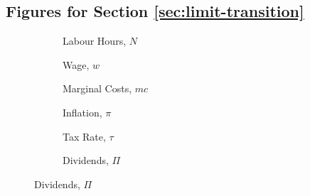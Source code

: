 \documentclass[a4paper,12pt]{article} %
\numberwithin{equation}{section} %
\numberwithin{figure}{section}
\numberwithin{table}{section}
\begin{document}
\begin{refsection}
\begin{appendices}
\subsection{Figures for Section \ref{sec:limit-transition}}
\label{sec-app:figures-limit-transition}

\begin{figure}[H]
    \caption{Supplement for Figure \ref{fig:baseline-permanent-limit-agg}}%
    \label{fig:baseline-permanent-limit-agg-extra}
    \begin{subfigure}[b]{0.49\textwidth}
     \caption{Labour Hours, $N$}
     \label{fig:baseline-permanent-limit-agg-N}
         \centering
         
     \end{subfigure}
     \hfill
     \begin{subfigure}[b]{0.49\textwidth}
     \caption{Wage, $w$}
     \label{fig:baseline-permanent-limit-agg-w}
         \centering
         
     \end{subfigure}
     \hfill
     \begin{subfigure}[b]{0.49\textwidth}
     \centering
     \caption{Marginal Costs, $mc$}
     \label{fig:baseline-permanent-limit-agg-mc}
         
     \end{subfigure}
     \hfill
     \begin{subfigure}[b]{0.49\textwidth}
     \centering
     \caption{Inflation, $\pi$}
     \label{fig:baseline-permanent-limit-agg-pi}
         
     \end{subfigure}
     \hfill
    \begin{subfigure}[b]{0.49\textwidth}
    \caption{Tax Rate, $\tau$}
    \label{fig:baseline-permanent-limit-agg-tau}
         \centering
         
     \end{subfigure}
     \hfill
     \begin{subfigure}[b]{0.49\textwidth}
     \caption{Dividends, $\Pi$}
     \label{fig:baseline-permanent-limit-agg-Pi}
         \centering
         
     \end{subfigure}


\end{figure}
\end{appendices}
\end{refsection}
\end{document}

